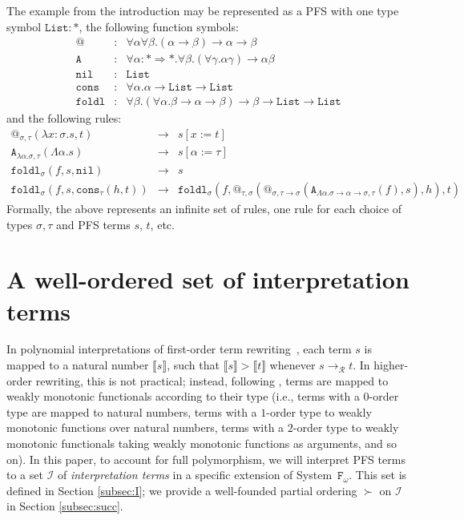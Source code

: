 \documentclass[a4paper,UKenglish,cleveref,autoref,numberwithinsect]{lipics-v2019}
\theoremstyle{definition}
\newcommand{\Fomega}{\mathtt{F}_\omega}
\newcommand{\Rules}{\mathcal{R}}
\newcommand{\Iterms}{\mathcal{I}}
\newcommand{\arrkind}{\Rightarrow}
\newcommand{\arrtype}{\rightarrow}
\newcommand{\abs}[2]{\lambda #1.#2}
\newcommand{\tabs}[2]{\Lambda #1.#2}
\newcommand{\arr}[1]{\longrightarrow_{#1}}
\newcommand{\red}{\longrightarrow}
\newcommand{\interpret}[1]{\llbracket #1 \rrbracket}
\newcommand{\List}{\mathtt{List}}
\newcommand{\nil}{\mathtt{nil}}
\newcommand{\cons}{\mathtt{cons}}
\begin{document}
\begin{example}\label{ex_fold_pafs}
  The example from the introduction may be represented as a PFS with
  one type symbol $\mathtt{List} : *$, the following function symbols:
  \[
  \begin{array}{rcl}
    @ & : & \forall \alpha \forall \beta . (\alpha \arrtype \beta) \arrtype \alpha \arrtype \beta \\
    \mathtt{A} & : & \forall \alpha : * \arrkind * . \forall \beta .
    (\forall \gamma .\alpha \gamma) \arrtype \alpha \beta \\
    \mathtt{nil} & : & \List \\
    \mathtt{cons} & : & \forall \alpha . \alpha \arrtype \List \arrtype \List \\
    \mathtt{foldl} & : & \forall \beta . (\forall \alpha . \beta \arrtype \alpha \arrtype \beta) \arrtype \beta \arrtype \List \arrtype \List
  \end{array}
  \]
  and the following rules:
  \[
  \begin{array}{rcl}
    @_{\sigma,\tau}(\abs{x:\sigma}{s},t) & \red & s[x:=t] \\
    \mathtt{A}_{\abs{\alpha}{\sigma},\tau}(\tabs{\alpha}{s}) & \red &
    s[\alpha:=\tau] \\
    \mathtt{foldl}_\sigma(f,s,\nil) & \red & s \\
    \mathtt{foldl}_\sigma(f,s,\cons_\tau(h,t)) & \red & \mathtt{foldl}_\sigma(f,@_{\tau,\sigma}(@_{\sigma,\tau
    \arrtype\sigma}(\mathtt{A}_{\tabs{\alpha}{\sigma\arrtype\alpha\arrtype\sigma},\tau}(f),s),h),t)
  \end{array}
  \]
  Formally, the above represents an infinite set of rules, one rule for
  each choice of types $\sigma,\tau$ and PFS terms $s$, $t$, etc.
\end{example}

\section{A well-ordered set of interpretation terms}\label{sec:World}

In polynomial interpretations of first-order term
rewriting~\cite[Chapter 6.2]{Terese2003}, each term $s$ is mapped to a
natural number $\interpret{s}$, such that $\interpret{s} > \interpret{t}$
whenever $s \arr{\Rules} t$.  In higher-order rewriting, this is not
practical; instead, following \cite{pol:96}, terms are mapped to weakly
monotonic functionals according to their type (i.e., terms with a $0$-order
type are mapped to natural numbers, terms with a $1$-order type to weakly
monotonic functions over natural numbers, terms with a $2$-order type to
weakly monotonic functionals taking weakly monotonic functions as
arguments, and so on).  In this paper, to account for full polymorphism,
we will interpret PFS terms to a set $\Iterms$ of \emph{interpretation terms}
in a specific extension of System~$\Fomega$.  This set is defined in Section
\ref{subsec:I}; we provide a well-founded partial ordering $\succ$ on
$\Iterms$ in Section \ref{subsec:succ}.
\end{document}
